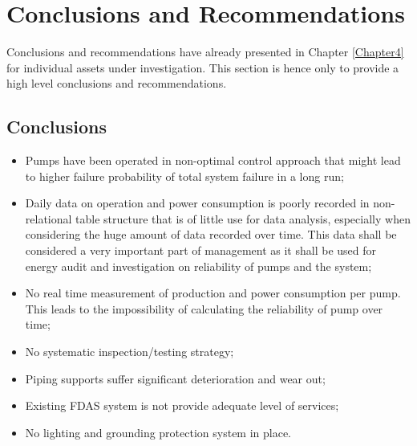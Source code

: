 \chapter{Conclusions and Recommendations} %
\label{Chapter7}
Conclusions and recommendations have already presented in Chapter \ref{Chapter4} for individual assets under investigation. This section is hence only to provide a high level conclusions and recommendations.
\section{Conclusions}
\begin{itemize}
\item Pumps have been operated in non-optimal control approach that might lead to higher failure probability of total system failure in a long run;

\item Daily data on operation and power consumption is poorly recorded in non-relational table structure that is of little use for data analysis, especially when considering the huge amount of data recorded over time. This data shall be considered a very important part of management as it shall be used for energy audit and investigation on reliability of pumps and the system;

\item No real time measurement of production and power consumption per pump. This leads to the impossibility of calculating the reliability of pump over time;

\item No systematic inspection/testing strategy;

\item Piping supports suffer significant deterioration and wear out;

\item Existing FDAS system is not provide adequate level of services;

\item No lighting and grounding protection system in place.
\end{itemize}

